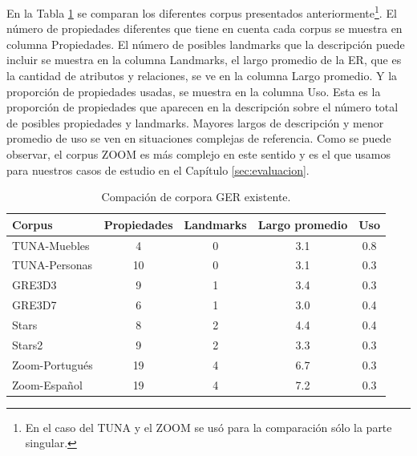 En la Tabla \ref{tab-comparison-prop} se comparan los diferentes corpus presentados anteriormente\footnote{En el caso del TUNA y el ZOOM se us\'o para la comparaci\'on s\'olo la parte singular.}. El n\'umero de propiedades diferentes que tiene en cuenta cada corpus se muestra en columna Propiedades. El n\'umero de posibles landmarks que la descripci\'on puede incluir se muestra en la columna Landmarks, el largo promedio de la ER, que es la cantidad de atributos y relaciones, se ve en la columna Largo promedio. Y la proporci\'on de propiedades usadas, se muestra en la columna Uso. Esta es la proporci\'on de propiedades que aparecen en la descripci\'on sobre el n\'umero total de posibles propiedades y landmarks. Mayores largos de descripci\'on y menor promedio de uso se ven en situaciones complejas de referencia. Como se puede observar, el corpus ZOOM es m\'as complejo en este sentido y es el que usamos para nuestros casos de estudio en el Cap\'itulo \ref{sec:evaluacion}.

\begin{table}[ht]
\begin{center}
\footnotesize{

\begin{tabular} {  l c c c c}
\hline
Corpus											&Propiedades			  & Landmarks			& Largo promedio	& Uso \\
\hline
TUNA-Muebles							  & 4								& 0							&	3.1				& 0.8   \\
TUNA-Personas								& 10							& 0							& 3.1				& 0.3   \\
GRE3D3											&	9								& 1							& 3.4				& 0.3   \\
GRE3D7											&	6								& 1							& 3.0				& 0.4   \\
Stars												&	8								& 2							& 4.4				& 0.4   \\
Stars2											& 9								& 2							& 3.3				& 0.3   \\
Zoom-Portugu\'es						& 19							& 4							& 6.7				& 0.3   \\
Zoom-Espa\~nol							& 19							& 4							& 7.2				& 0.3   \\
\hline
\end{tabular}
}
\end{center}
\caption{Compaci\'on de corpora GER existente.}\label{tab-comparison-prop}
\end{table}

